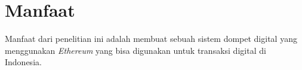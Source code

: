 \section{Manfaat}
\label{sec:manfaat}

Manfaat dari penelitian ini adalah membuat sebuah sistem dompet digital yang menggunakan \emph{Ethereum} yang bisa digunakan untuk transaksi digital di Indonesia.



















